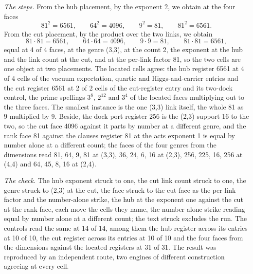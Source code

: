 \begin{chproof}
\textit{The steps.} From the hub placement, by the exponent 2, we obtain at the four faces
\begin{equation}
81^2 = 6561,\qquad 64^2 = 4096,\qquad 9^2 = 81,\qquad 81^2 = 6561.
\end{equation}
From the cut placement, by the product over the two links, we obtain
\begin{equation}
81\cdot 81 = 6561,\qquad 64\cdot 64 = 4096,\qquad 9\cdot 9 = 81,\qquad 81\cdot 81 = 6561,
\end{equation}
equal at 4 of 4 faces, at the genre (3,3), at the count 2, the exponent at the hub and the link count at the cut, and at the per-link factor 81, so the two cells are one object at two placements. The located cells agree: the hub register 6561 at 4 of 4 cells of the vacuum expectation, quartic and Higgs-and-carrier entries and the cut register 6561 at 2 of 2 cells of the cut-register entry and its two-dock control, the prime spellings $3^8$, $2^{12}$ and $3^4$ of the located faces multiplying out to the three faces. The smallest instance is the one (3,3) link itself, the whole 81 as 9 multiplied by 9. Beside, the dock port register 256 is the (2,3) support 16 to the two, so the cut face 4096 against it parts by number at a different genre, and the rank face 81 against the clauses register 81 at the acts exponent 1 is equal by number alone at a different count; the faces of the four genres from the dimensions read 81, 64, 9, 81 at (3,3), 36, 24, 6, 16 at (2,3), 256, 225, 16, 256 at (4,4) and 64, 45, 8, 16 at (2,4).



\textit{The check.} The hub exponent struck to one, the cut link count struck to one, the genre struck to (2,3) at the cut, the face struck to the cut face as the per-link factor and the number-alone strike, the hub at the exponent one against the cut at the rank face, each move the cells they name, the number-alone strike reading equal by number alone at a different count; the text struck excludes the run. The controls read the same at 14 of 14, among them the hub register across its entries at 10 of 10, the cut register across its entries at 10 of 10 and the four faces from the dimensions against the located registers at 31 of 31. The result was reproduced by an independent route, two engines of different construction agreeing at every cell.
\end{chproof}
